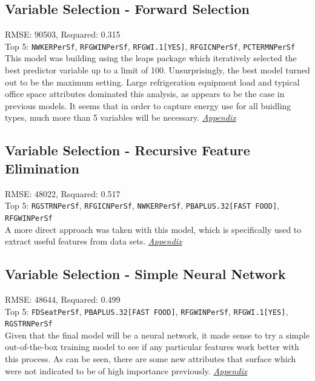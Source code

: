 \subsection{Variable Selection - Forward Selection}
RMSE: 90503, Rsquared: 0.315\\
Top 5: \lstinline{NWKERPerSf}, \lstinline{RFGWINPerSf}, \lstinline{RFGWI.1[YES]}, \lstinline{RFGICNPerSf}, \lstinline{PCTERMNPerSf}
\\[0.1in]
\indent This model was building using the leaps package which iteratively selected the best predictor variable up to a limit of 100.  Unsurprisingly, the best model turned out to be the maximum setting.  Large refrigeration equipment load and typical office space attributes dominated this analysis, as appears to be the case in previous models.  It seems that in order to capture energy use for all buidling types, much more than 5 variables will be necessary.  \textit{\hyperref[appendix:electricity:lp]{Appendix}}

\subsection{Variable Selection - Recursive Feature Elimination}
RMSE: 48022, Rsquared: 0.517\\
Top 5: \lstinline{RGSTRNPerSf}, \lstinline{RFGICNPerSf}, \lstinline{NWKERPerSf}, \lstinline{PBAPLUS.32[FAST FOOD]}, \lstinline{RFGWINPerSf}
\\[0.1in]
\indent A more direct approach was taken with this model, which is specifically used to extract useful features from data sets. \textit{\hyperref[appendix:electricity:rfe]{Appendix}}

\subsection{Variable Selection - Simple Neural Network}
RMSE: 48644, Rsquared: 0.499\\
Top 5: \lstinline{FDSeatPerSf}, \lstinline{PBAPLUS.32[FAST FOOD]}, \lstinline{RFGWINPerSf}, \lstinline{RFGWI.1[YES]}, \lstinline{RGSTRNPerSf}
\\[0.1in]
\indent Given that the final model will be a neural network, it made sense to try a simple out-of-the-box training model to see if any particular features work better with this process.  As can be seen, there are some new attributes that surface which were not indicated to be of high importance previously.  \textit{\hyperref[appendix:electricity:snn]{Appendix}}

